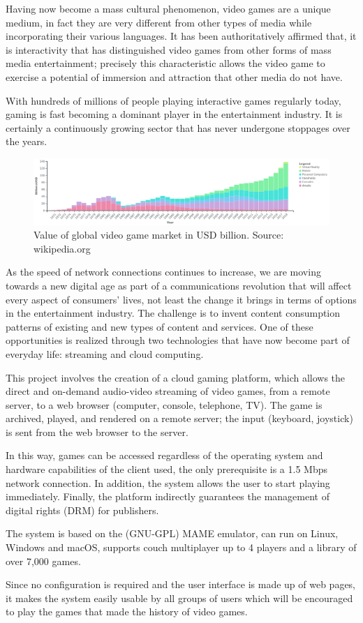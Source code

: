 Having now become a mass cultural phenomenon, video games are a unique medium, in fact they are very different from other types of media while incorporating their various languages. It has been authoritatively affirmed that, it is interactivity that has distinguished video games from other forms of mass media entertainment; precisely this characteristic allows the video game to exercise a potential of immersion and attraction that other media do not have.

With hundreds of millions of people playing interactive games regularly today, gaming is fast becoming a dominant player in the entertainment industry.	It is certainly a continuously growing sector that has never undergone stoppages over the years.

\begin{figure}[H]
	\includegraphics[width=\linewidth]{immagini/valore_commerciale_giochi_globale.png}
	\caption{Value of global video game market in USD billion. Source: wikipedia.org}
	\label{fig:valore_commerciale_giochi_globale}
\end{figure}

As the speed of network connections continues to increase, we are moving towards a new digital age as part of a communications revolution that will affect every aspect of consumers' lives, not least the change it brings in terms of options in the entertainment industry. The challenge is to invent content consumption patterns of existing and new types of content and services. One of these opportunities is realized through two technologies that have now become part of everyday life: streaming and cloud computing.

This project involves the creation of a cloud gaming platform, which allows the direct and on-demand audio-video streaming of video games, from a remote server, to a web browser (computer, console, telephone, TV). The game is archived, played, and rendered on a remote server; the input (keyboard, joystick) is sent from the web browser to the server.

In this way, games can be accessed regardless of the operating system and hardware capabilities of the client used, the only prerequisite is a 1.5 Mbps network connection. In addition, the system allows the user to start playing immediately. Finally, the platform indirectly guarantees the management of digital rights (DRM) for publishers.

The system is based on the (GNU-GPL) MAME emulator, can run on Linux, Windows and macOS, supports couch multiplayer up to 4 players and a library of over 7,000 games.

Since no configuration is required and the user interface is made up of web pages, it makes the system easily usable by all groups of users which will be encouraged to play the games that made the history of video games.